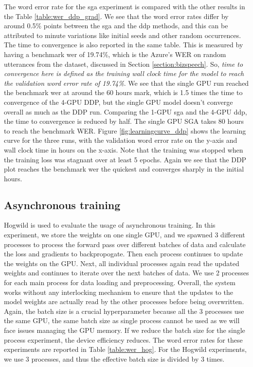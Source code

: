 The word error rate for the \acrshort{sga} experiment is compared with the other results in the Table \ref{table:wer_ddp_grad}. We see that the word error rates differ by around 0.5\% points between the \acrshort{sga} and the \acrshort{ddp} methods, and this can be attributed to minute variations like initial seeds and other random occurrences. The time to convergence is also reported in the same table. This is measured by having a benchmark \acrshort{wer} of 19.74\%, which is the Azure's WER on random utterances from the dataset, discussed in Section \ref{section:bizspeech}. So, \emph{time to convergence here is defined as the training wall clock time for the model to reach the validation word error rate of 19.74\%}. We see that the single GPU run reached the benchmark \acrshort{wer} at around the 60 hours mark, which is 1.5 times the time to convergence of the 4-GPU DDP, but the single GPU model doesn't converge overall as much as the DDP run. Comparing the 1-GPU \acrshort{sga} and the 4-GPU \acrshort{ddp}, the time to convergence is reduced by half. The single GPU SGA takes 80 hours to reach the benchmark WER. Figure \ref{fig:learningcurve_ddp} shows the learning curve for the three runs, with the validation word error rate on the y-axis and wall clock time in hours on the x-axis. Note that the training was stopped when the training loss was stagnant over at least 5 epochs. Again we see that the DDP plot reaches the benchmark \acrshort{wer} the quickest and converges sharply in the initial hours. 

\subsection{Asynchronous training}
Hogwild \cite{Niu2011HOGWILD:Descent} is used to evaluate the usage of asynchronous training. In this experiment, we store the weights on one single GPU, and we spawned 3 different processes to process the forward pass over different batches of data and calculate the loss and gradients to backpropogate. Then each process continues to update the weights on the GPU. Next, all individual processes again read the updated weights and continues to iterate over the next batches of data. We use 2 processes for each main process for data loading and preprocessing. Overall, the system works without any interlocking mechanism to ensure that the updates to the model weights are actually read by the other processes before being overwritten. Again, the batch size is a crucial hyperparameter because all the 3 processes use the same GPU, the same batch size as single process cannot be used as we will face issues managing the GPU memory. If we reduce the batch size for the single process experiment, the device efficiency reduces. The word error rates for these experiments are reported in Table \ref{table:wer_hog}. For the Hogwild experiments, we use 3 processes, and thus the effective batch size is divided by 3 times. 

